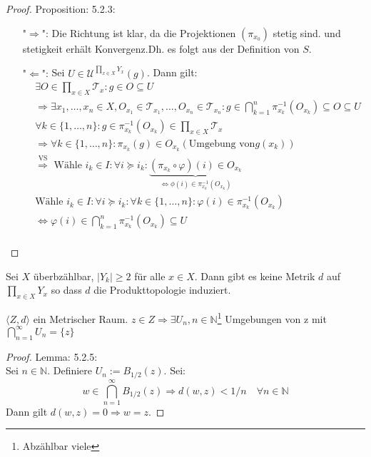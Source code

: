 \begin{proof}{Proposition: 5.2.3:}\\
    \begin{itemize}
        \item["$\Rightarrow$":]
        Die Richtung ist klar, da die Projektionen $(\pi_{x_{0}})$ stetig sind. 
        und stetigkeit erhält Konvergenz.Dh. es folgt aus der Definition
        von $S$.
        \item["$\Leftarrow$":]
        Sei $U \in \mathcal{U}^{\prod_{x \in X} Y_x}(g)$.
        Dann gilt:
        \begin{equation*}
        \begin{split}
        &\exists O \in \prod_{x \in X} \mathcal{T}_x : g \in O \subseteq U\\
        &\Rightarrow \exists x_1, \ldots, x_n \in X, 
        O_{x_1} \in \mathcal{T}_{x_1}, \ldots, O_{x_n} \in \mathcal{T}_{x_n} :
        g \in \bigcap_{k=1}^{n} \pi_{x_k}^{-1}(O_{x_k}) \subseteq O \subseteq U\\
        &\forall k \in \{1, \ldots, n \}: g \in \pi_{x_k}^{-1}(O_{x_k}) \in \prod_{x \in X} \mathcal{T}_x\\
        &\Rightarrow \forall k \in \{1, \ldots, n \} : \pi_{x_k}(g) \in O_{x_k} ( \text{Umgebung von} g(x_k)) \\
        &\overset{\text{VS}}{\Rightarrow} \text{ Wähle } i_k \in I :
        \forall i \succeq i_k : 
        \underbrace{(\pi_{x_k} \circ \varphi)(i) \in O_{x_k}}_{\Leftrightarrow \phi(i) \in \pi_{x_k}^{-1}(O_{x_k})}\\
        &\text{Wähle } i_k \in I : \forall i \succeq i_k : \forall k \in \{1, \ldots, n\} :
        \varphi(i) \in \pi_{x_k}^{-1}(O_{x_k})\\
        &\Leftrightarrow \varphi(i) \in \bigcap_{k=1}^{n} \pi_{x_k}^{-1}(O_{x_k}) \subseteq U\\
        \end{split}
        \end{equation*}
    \end{itemize}
    
\end{proof}

\mprop{}
{
    Sei $X$ überbzählbar, $\mid Y_k\mid \geq 2$ für alle $x \in X$.
    Dann gibt es keine Metrik $d$ auf $\prod_{x \in X} Y_x$ 
    so dass $d$ die Produkttopologie induziert.
}

\mlenma{}
{
    $\langle Z, d \rangle$ ein Metrischer Raum. $z \in Z \Rightarrow 
    \exists U_n, n \in \mathbb{N}$\footnote{ Abzählbar viele} 
    Umgebungen von z mit $\bigcap_{n=1}^{\infty} U_n = \{z\}$
}
\begin{proof}{Lemma: 5.2.5:}\\
    Sei $n \in \mathbb{N}$.
    Definiere $U_n := B_{1/2}(z)$.
    Sei:
    $$
    w \in \bigcap_{n=1}^{\infty} B_{1/2}(z) \Rightarrow d(w,z) < 1/n \quad 
    \forall n \in \mathbb{N}
    $$
    Dann gilt $d(w,z) = 0 \Rightarrow w = z$.
\end{proof}

